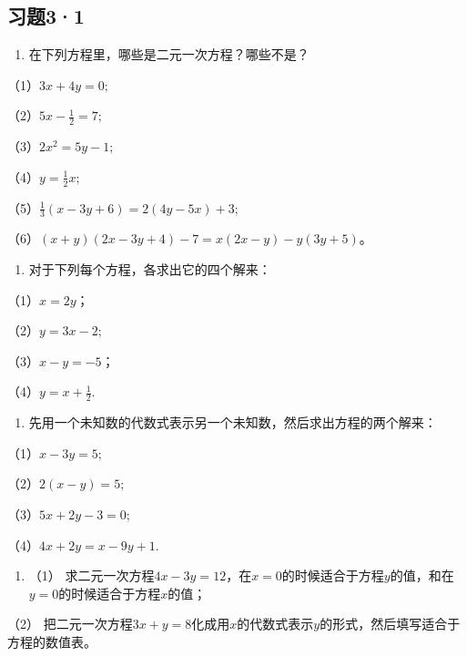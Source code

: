 \subsection{习题3·1}

\begin{enumerate}
\item
  在下列方程里，哪些是二元一次方程？哪些不是？
\end{enumerate}

（1）\(3x + 4y = 0;\)

（2）\(5x - \frac{1}{2} = 7;\)

（3）\(2x^{2} = 5y - 1;\)

（4）\(y = \frac{1}{2} x;\)

（5）\(\frac{1}{3} (x - 3y + 6) = 2(4y - 5x) + 3;\)

（6）\((x + y)(2x - 3y + 4) - 7 = x(2x - y) - y(3y + 5)\)。

\begin{enumerate}[start=2]
\item
  对于下列每个方程，各求出它的四个解来：
\end{enumerate}

（1）\(x = 2y\)；

（2）\(y = 3x - 2;\)

（3）\(x - y = -5\)；

（4）\(y = x + \frac{1}{2}.\)

\begin{enumerate}[start=3]
\item
  先用一个未知数的代数式表示另一个未知数，然后求出方程的两个解来：
\end{enumerate}

（1）\(x - 3y = 5;\)

（2）\(2(x - y) = 5;\)

（3）\(5x + 2y - 3 = 0;\)

（4）\(4x + 2y = x - 9y + 1.\)

\begin{enumerate}[start=4]
\item
  （1）
  求二元一次方程\(4x - 3y = 12\)，在\(x = 0\)的时候适合于方程\(y\)的值，和在\(y = 0\)的时候适合于方程\(x\)的值；
\end{enumerate}

（2）
把二元一次方程\(3x + y = 8\)化成用\(x\)的代数式表示\(y\)的形式，然后填写适合于方程的数值表。

{\centering
\small\setlength{\tabcolsep}{3pt}%
\par
}

